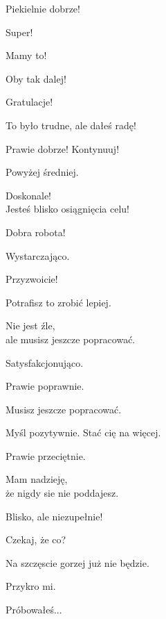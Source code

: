  Piekielnie dobrze!

 Super!

 Mamy to!

 Oby tak dalej!

 Gratulacje!

 To było trudne, ale dałeś radę!

 Prawie dobrze! Kontynuuj!

 Powyżej średniej.

 Doskonale!\\ Jesteś blisko osiągnięcia celu!

 Dobra robota!

 Wystarczająco.

 Przyzwoicie!

 Potrafisz to zrobić lepiej.

 Nie jest źle,\\ ale musisz jeszcze popracować.

 Satysfakcjonująco.

 Prawie poprawnie.

 Musisz jeszcze popracować. 

 Myśl pozytywnie. Stać cię na więcej.

 Prawie przeciętnie. 

 Mam nadzieję,\\ że nigdy sie nie poddajesz.

 Blisko, ale niezupełnie!

 Czekaj, że co?

 Na szczęscie gorzej już nie będzie.  

 Przykro mi.

 Próbowałeś...

